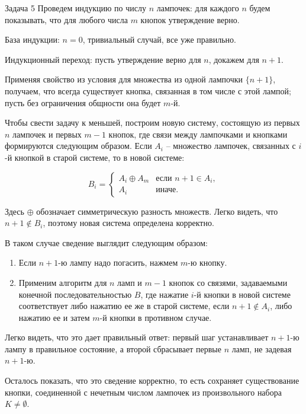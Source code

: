 \documentclass{article}
\begin{document}
	\begin{section}{Задача 5}
		Проведем индукцию по числу $n$ лампочек: для каждого $n$ будем показывать, что для любого числа $m$ кнопок утверждение верно.

		База индукции: $n = 0$, тривиальный случай, все уже правильно.

		Индукционный переход: пусть утверждение верно для $n$, докажем для $n + 1$.

		Применяя свойство из условия для множества из одной лампочки $\{n + 1\}$, получаем, что всегда существует кнопка, связанная в том числе с этой лампой; пусть без ограничения общности она будет $m$-й.

		Чтобы свести задачу к меньшей, построим новую систему, состоящую из первых $n$ лампочек и первых $m - 1$ кнопок, где связи между лампочками и кнопками формируются следующим образом. Если $A_i$ -- множество лампочек, связанных с $i$-й кнопкой в старой системе, то в новой системе:

		\begin{equation*}
			B_i = \begin{cases}
				A_i \oplus A_m & \text{если } n + 1 \in A_i, \\
				A_i & \text{иначе.}
			\end{cases}
		\end{equation*}

		Здесь $\oplus$ обозначает симметрическую разность множеств. Легко видеть, что $n + 1 \not\in B_i$, поэтому новая система определена корректно.

		В таком случае сведение выглядит следующим образом:

		\begin{enumerate}
			\item Если $n + 1$-ю лампу надо погасить, нажмем $m$-ю кнопку.

			\item Применим алгоритм для $n$ ламп и $m-1$ кнопок со связями, задаваемыми конечной последовательностью $B$, где нажатие $i$-й кнопки в новой системе соответствует либо нажатию ее же в старой системе, если $n + 1 \not\in A_i$, либо нажатию ее и затем $m$-й кнопки в противном случае.
		\end{enumerate}

		Легко видеть, что это дает правильный ответ: первый шаг устанавливает $n + 1$-ю лампу в правильное состояние, а второй сбрасывает первые $n$ ламп, не задевая $n + 1$-ю.

		Осталось показать, что это сведение корректно, то есть сохраняет существование кнопки, соединенной с нечетным числом лампочек из произвольного набора $K \ne \emptyset$.


\end{section}
\end{document}
